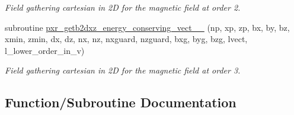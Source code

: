\begin{DoxyCompactItemize}
\begin{DoxyCompactList}\small\item\em Field gathering cartesian in 2D for the magnetic field at order 2. \end{DoxyCompactList}\item 
subroutine \hyperlink{field__gathering__2d_8_f90_a415f9b1053a57ec62f536d8d165af5cf}{pxr\+\_\+getb2dxz\+\_\+energy\+\_\+conserving\+\_\+vect\+\_\+\_} (np, xp, zp, bx, by, bz, xmin, zmin, dx, dz, nx, nz,                                                                       nxguard, nzguard, bxg, byg, bzg, lvect, l\+\_\+lower\+\_\+order\+\_\+in\+\_\+v)
\begin{DoxyCompactList}\small\item\em Field gathering cartesian in 2D for the magnetic field at order 3. \end{DoxyCompactList}\end{DoxyCompactItemize}


\subsection{Function/\+Subroutine Documentation}
